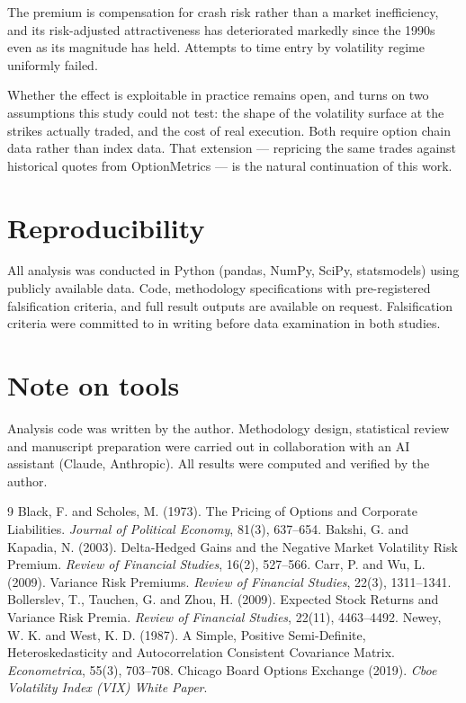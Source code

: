 \documentclass[11pt,a4paper]{article}
\begin{document}
The premium is compensation for crash risk rather than a market inefficiency, and its risk-adjusted
attractiveness has deteriorated markedly since the 1990s even as its magnitude has held. Attempts to
time entry by volatility regime uniformly failed.

Whether the effect is exploitable in practice remains open, and turns on two assumptions this study
could not test: the shape of the volatility surface at the strikes actually traded, and the cost of
real execution. Both require option chain data rather than index data. That extension --- repricing the
same trades against historical quotes from OptionMetrics --- is the natural continuation of this work.

\section*{Reproducibility}

All analysis was conducted in Python (pandas, NumPy, SciPy, statsmodels) using publicly available data.
Code, methodology specifications with pre-registered falsification criteria, and full result outputs are
available on request. Falsification criteria were committed to in writing before data examination in both
studies.

\section*{Note on tools}

Analysis code was written by the author. Methodology design, statistical review and manuscript
preparation were carried out in collaboration with an AI assistant (Claude, Anthropic). All results were
computed and verified by the author.

\begin{thebibliography}{9}
\small
{} Black, F. and Scholes, M. (1973). The Pricing of Options and Corporate Liabilities.
\textit{Journal of Political Economy}, 81(3), 637--654.
 Bakshi, G. and Kapadia, N. (2003). Delta-Hedged Gains and the Negative Market Volatility
Risk Premium. \textit{Review of Financial Studies}, 16(2), 527--566.
 Carr, P. and Wu, L. (2009). Variance Risk Premiums. \textit{Review of Financial Studies},
22(3), 1311--1341.
 Bollerslev, T., Tauchen, G. and Zhou, H. (2009). Expected Stock Returns and Variance Risk
Premia. \textit{Review of Financial Studies}, 22(11), 4463--4492.
 Newey, W. K. and West, K. D. (1987). A Simple, Positive Semi-Definite, Heteroskedasticity and
Autocorrelation Consistent Covariance Matrix. \textit{Econometrica}, 55(3), 703--708.
 Chicago Board Options Exchange (2019). \textit{Cboe Volatility Index (VIX) White Paper}.
\end{thebibliography}
\end{document}
